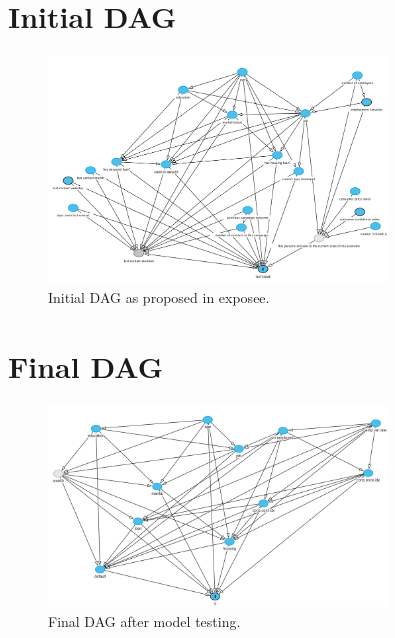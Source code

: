 \documentclass[11pt]{article}
\begin{document}
\section{Initial DAG}
\label{sec:initial_dag}
\begin{figure}[h]
	\centering
	\includegraphics[width=0.8\textwidth]{images/initial_dag}
	\caption{Initial DAG as proposed in exposee.}
	\label{fig:initial_dag}
\end{figure}

\section{Final DAG}
\label{sec:final_dag}
\begin{figure}[h]
	\centering
	\includegraphics[width=0.8\textwidth]{images/final_dag}
	\caption{Final DAG after model testing.}
	\label{fig:final_dag}
\end{figure}

\newpage
\end{document}
